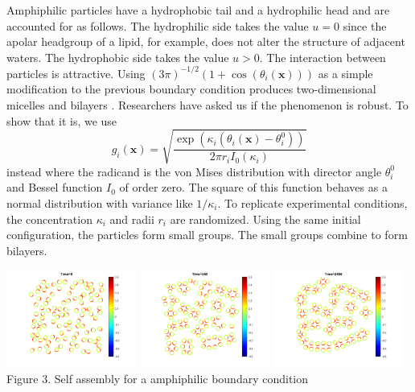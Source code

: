 Amphiphilic particles have a hydrophobic tail and a hydrophilic head
and are accounted for as follows.
The hydrophilic side takes the value $u = 0$ since the
apolar headgroup of a lipid, for example, does not alter the structure
of adjacent waters. The hydrophobic side takes the value $u > 0$. 
The interaction between particles is attractive. Using
$(3\pi )^{-1/2}(1 + \cos(\theta_i(\mathbf{x})))$
as a simple modification to the previous boundary condition 
produces two-dimensional micelles and bilayers \cite{Fu2018_SIAM}.
Researchers have asked us if the phenomenon is robust. To show
that it is, we use 
\begin{equation}
\label{eq:vonMises}
g_i(\mathbf{x}) =
\sqrt{
  \frac{\exp( \kappa_i(\theta_i(\mathbf{x}) - \theta^0_i))}
  {2\pi r_i I_0(\kappa_i)}}
\end{equation}
instead where the radicand is the von Mises 
distribution with director angle $\theta^0_i$ and Bessel function
$I_0$ of order zero. The square of this function behaves as a normal
distribution with variance like $1/\kappa_i$. To replicate
experimental conditions, the concentration $\kappa_i$ and radii
$r_i$ are randomized. Using the same initial configuration, the
particles form small groups. The small groups combine to form bilayers.
\begin{center}
    \includegraphics[width=0.32\textwidth]{figures/SpecificAim1/N100_B1.png}
    \includegraphics[width=0.32\textwidth]{figures/SpecificAim1/N100_B2.png}
    \includegraphics[width=0.32\textwidth]{figures/SpecificAim1/N100_B4.png}\\
    Figure 3. Self assembly for a amphiphilic boundary condition
    \label{fig:self-assemblyA}
\end{center}

